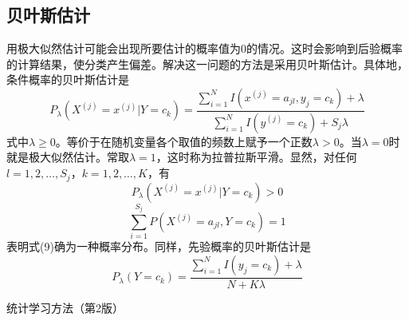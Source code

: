 \documentclass[UTF8]{ctexart}
\begin{document}
\subsection{贝叶斯估计}
用极大似然估计可能会出现所要估计的概率值为$0$的情况。这时会影响到后验概率的计算结果，使分类产生偏差。解决这一问题的方法是采用贝叶斯估计。具体地，条件概率的贝叶斯估计是
\begin{equation}
	P_{\lambda}(X^{(j)}=x^{(j)}|Y=c_k)=\frac{  \sum^N_{i=1}I(x^{(j)}=a_{jl},y_j=c_k)+\lambda  }  {  \sum^N_{i=1}I(y^{(j)}=c_k)+S_j\lambda  }
\end{equation}
式中$\lambda \ge 0 $。等价于在随机变量各个取值的频数上赋予一个正数$\lambda > 0 $。当$\lambda = 0 $时就是极大似然估计。常取$\lambda =1 $，这时称为拉普拉斯平滑。显然，对任何$l=1,2,\dots ,S_j$，$k=1,2,\dots ,K$，有
$$ P_{\lambda}(X^{(j)}=x^{(j)}|Y=c_k)>0$$
$$\sum^{S_j}_{i=1}P(X^{(j)}=a_{jl},Y=c_k)=1 $$
表明式(9)确为一种概率分布。同样，先验概率的贝叶斯估计是
\begin{equation}
	P_{\lambda}(Y=c_k)=\frac{  \sum^N_{i=1} I (y_j=c_k)+\lambda  }  { N+K\lambda  }
\end{equation}





\begin{thebibliography}{unsrt}
	\bibitem[1]{} 统计学习方法（第2版）
\end{thebibliography}
\end{document}
